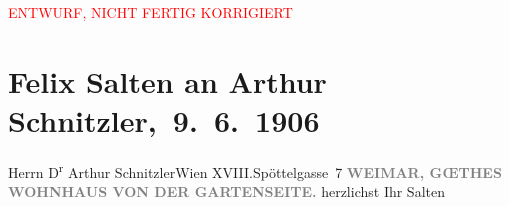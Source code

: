 
\begin{center}
            \textcolor{red}{ENTWURF, NICHT FERTIG KORRIGIERT}
                      \end{center}
            
         
         \renewcommand{\erwaehntePersonen}{Personen: Felix Salten}
         \renewcommand{\erwaehnteOrte}{Orte: Edmund-Weiß-Gasse 7, Goethes Wohnhaus, Weimar, Wien, XVIII., Währing}
         \renewcommand{\erwaehnteWerke}{}
               \section[ Felix Salten an Arthur Schnitzler, 9. 6. 1906]{ Felix Salten an Arthur Schnitzler, 9. 6. 1906}\nopagebreak{}\rehead{ }\begin{ledgroupsized}[t]{13cm}\normalsize\beginnumbering \toendnotes[C]{\smallbreak\pagebreak[2]} 
\pstart{}{\pb}Herrn D\textsuperscript{r} Arthur Schnitzler\pend{}\pstart{}Wien XVIII.\pend{}\pstart{}Spöttelgasse 7\pend{}{\bigskip}\pstart
           \noindent{}\centering{}{\pb}\textcolor{gray}{\textbf{\textbf{WEIMAR}, GŒTHES WOHNHAUS VON DER
                        GARTENSEITE.}}\pend
           \pstart
           herzlichst Ihr \spacefill\mbox{Salten}\pend
           
         
         \endnumbering{}\end{ledgroupsized}  \newcommand{\dateiname}{L03424}\newcommand{\titel}{Felix Salten an Arthur Schnitzler, 9. 6. 1906}\newcommand{\editorInnen}{Martin Anton Müller und Laura Untner}
      